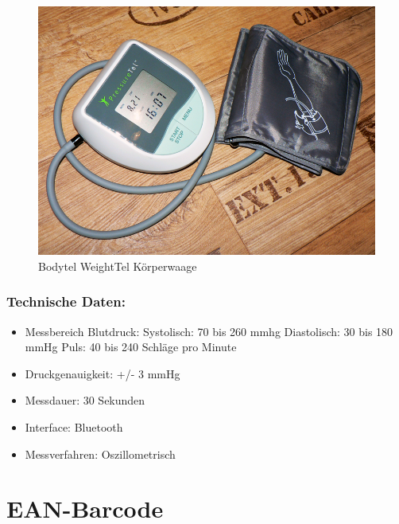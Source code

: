 \begin{figure}[h]
  \centering
  \includegraphics[scale=0.3]{fotos/devices/PressureTel_blutdruckmesser.png}
  \caption{Bodytel WeightTel K\"orperwaage}
 
\end{figure}

\subsubsection{Technische Daten:\cite{PressureTel}}

\begin{itemize}
 \item Messbereich Blutdruck:
 \subitem Systolisch: 70 bis 260 mmhg
 \subitem Diastolisch: 30 bis 180 mmHg
 \subitem Puls: 40 bis 240 Schl\"age pro Minute
 \item Druckgenauigkeit: +/- 3 mmHg
 \item Messdauer: 30 Sekunden
 \item Interface: Bluetooth
 \item Messverfahren: Oszillometrisch
\end{itemize}


\section{EAN-Barcode}

